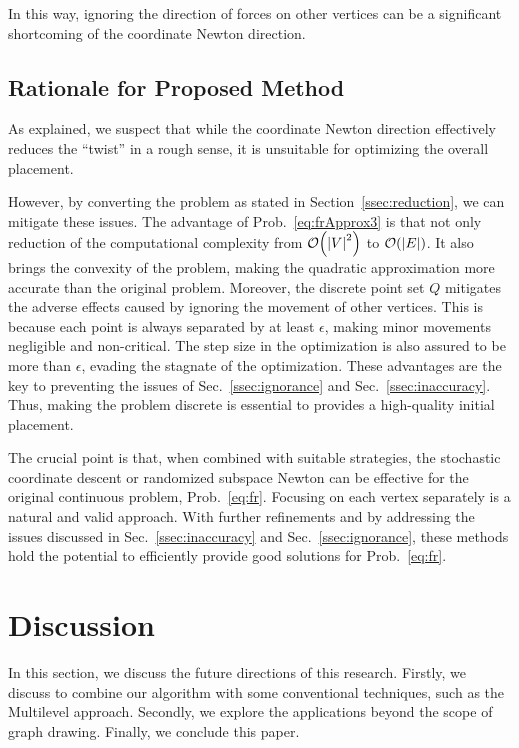 \documentclass[dvipdfmx,10pt,journal,compsoc]{IEEEtran}
\begin{document}
In this way, ignoring the direction of forces on other vertices can be a significant shortcoming of the coordinate Newton direction.

\subsection{Rationale for Proposed Method}\label{ssec:rationale}

As explained, we suspect that while the coordinate Newton direction effectively reduces the ``twist'' in a rough sense, it is unsuitable for optimizing the overall placement.

However, by converting the problem as stated in Section~\ref{ssec:reduction}, we can mitigate these issues.
The advantage of Prob.~\eqref{eq:frApprox3} is that not only reduction of the computational complexity from $\order{\abs{V}^2}$ to $\order{\abs{E}}$.
It also brings the convexity of the problem, making the quadratic approximation more accurate than the original problem.
Moreover, the discrete point set $Q$ mitigates the adverse effects caused by ignoring the movement of other vertices. This is because each point is always separated by at least $\epsilon$, making minor movements negligible and non-critical. The step size in the optimization is also assured to be more than $\epsilon$, evading the stagnate of the optimization.
These advantages are the key to preventing the issues of Sec.~\ref{ssec:ignorance} and Sec.~\ref{ssec:inaccuracy}.
Thus, making the problem discrete is essential to provides a high-quality initial placement.

The crucial point is that, when combined with suitable strategies, the stochastic coordinate descent or randomized subspace Newton can be effective for the original continuous problem, Prob.~\eqref{eq:fr}.
Focusing on each vertex separately is a natural and valid approach.
With further refinements and by addressing the issues discussed in Sec.~\ref{ssec:inaccuracy} and Sec.~\ref{ssec:ignorance}, these methods hold the potential to efficiently provide good solutions for Prob.~\eqref{eq:fr}.

\section{Discussion} \label{sec:discussion}

In this section, we discuss the future directions of this research.
Firstly, we discuss to combine our algorithm with some conventional techniques, such as the Multilevel approach.
Secondly, we explore the applications beyond the scope of graph drawing.
Finally, we conclude this paper.
\end{document}
